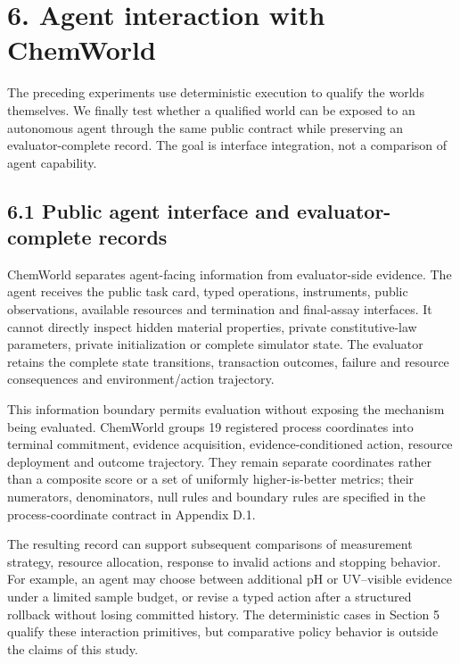 \documentclass[10pt,twocolumn]{article}
\begin{document}
\section{6. Agent interaction with
ChemWorld}\label{agent-interaction-with-chemworld}

The preceding experiments use deterministic execution to qualify the
worlds themselves. We finally test whether a qualified world can be
exposed to an autonomous agent through the same public contract while
preserving an evaluator-complete record. The goal is interface
integration, not a comparison of agent capability.

\subsection{6.1 Public agent interface and evaluator-complete
records}\label{public-agent-interface-and-evaluator-complete-records}

ChemWorld separates agent-facing information from evaluator-side
evidence. The agent receives the public task card, typed operations,
instruments, public observations, available resources and termination
and final-assay interfaces. It cannot directly inspect hidden material
properties, private constitutive-law parameters, private initialization
or complete simulator state. The evaluator retains the complete state
transitions, transaction outcomes, failure and resource consequences and
environment/action trajectory.

This information boundary permits evaluation without exposing the
mechanism being evaluated. ChemWorld groups 19 registered process
coordinates into terminal commitment, evidence acquisition,
evidence-conditioned action, resource deployment and outcome trajectory.
They remain separate coordinates rather than a composite score or a set
of uniformly higher-is-better metrics; their numerators, denominators,
null rules and boundary rules are specified in the process-coordinate
contract in Appendix D.1.

The resulting record can support subsequent comparisons of measurement
strategy, resource allocation, response to invalid actions and stopping
behavior. For example, an agent may choose between additional pH or
UV--visible evidence under a limited sample budget, or revise a typed
action after a structured rollback without losing committed history. The
deterministic cases in Section 5 qualify these interaction primitives,
but comparative policy behavior is outside the claims of this study.
\end{document}
